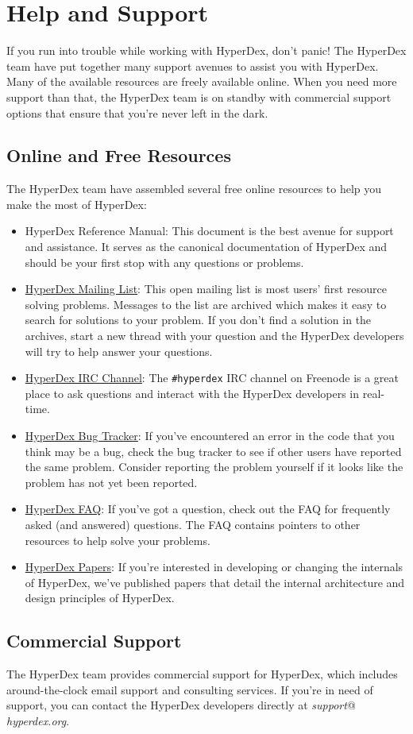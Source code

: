 \section{Help and Support}

If you run into trouble while working with HyperDex, don't panic!  The HyperDex
team have put together many support avenues to assist you with HyperDex.  Many
of the available resources are freely available online.  When you need more
support than that, the HyperDex team is on standby with commercial support
options that ensure that you're never left in the dark.

\subsection{Online and Free Resources}

The HyperDex team have assembled several free online resources to help you make
the most of HyperDex:

\begin{itemize}
\item HyperDex Reference Manual:  This document is the best avenue for support
    and assistance.  It serves as the canonical documentation of HyperDex and
    should be your first stop with any questions or problems.
\item \href{https://groups.google.com/group/hyperdex-discuss}{HyperDex Mailing List}:
    This open mailing list is most users' first resource solving problems.
    Messages to the list are archived which makes it easy to search for
    solutions to your problem.  If you don't find a solution in the archives,
    start a new thread with your question and the HyperDex developers will try
    to help answer your questions.
\item \href{http://webchat.freenode.net/?channels=hyperdex\&uio=d4}{HyperDex IRC Channel}:
    The \texttt{\#hyperdex} IRC channel on Freenode is a great place to ask
    questions and interact with the HyperDex developers in real-time.
\item \href{https://github.com/rescrv/HyperDex/issues}{HyperDex Bug Tracker}:
    If you've encountered an error in the code that you think may be a bug,
    check the bug tracker to see if other users have reported the same problem.
    Consider reporting the problem yourself if it looks like the problem has not
    yet been reported.
\item \href{http://hyperdex.org/FAQ/}{HyperDex FAQ}:
    If you've got a question, check out the FAQ for frequently asked (and
    answered) questions.  The FAQ contains pointers to other resources to help
    solve your problems.
\item \href{http://hyperdex.org/papers/}{HyperDex Papers}:
    If you're interested in developing or changing the internals of HyperDex,
    we've published papers that detail the internal architecture and design
    principles of HyperDex.
\end{itemize}

\subsection{Commercial Support}

The HyperDex team provides commercial support for HyperDex, which includes
around-the-clock email support and consulting services.  If you're in need of
support, you can contact the HyperDex developers directly at {\em support}@{\em
hyperdex.org}.
